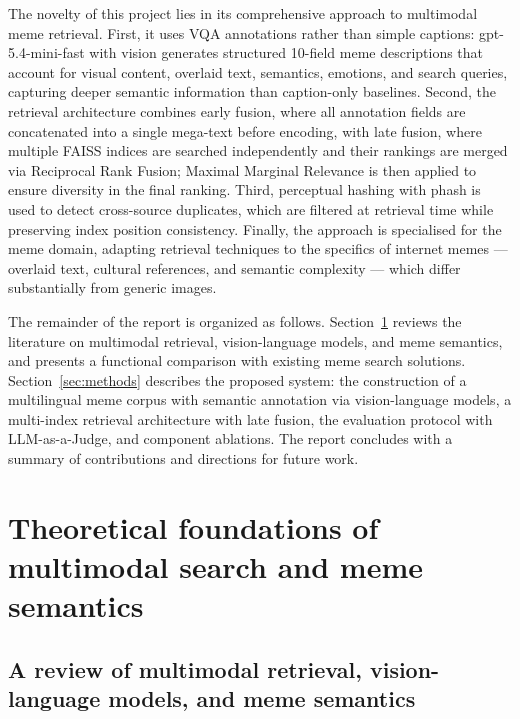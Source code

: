 \documentclass[a4paper,12pt]{article}
\begin{document}
The novelty of this project lies in its comprehensive approach to multimodal meme retrieval. First, it uses VQA annotations rather than simple captions: gpt-5.4-mini-fast with vision generates structured 10-field meme descriptions that account for visual content, overlaid text, semantics, emotions, and search queries, capturing deeper semantic information than caption-only baselines. Second, the retrieval architecture combines early fusion, where all annotation fields are concatenated into a single mega-text before encoding, with late fusion, where multiple FAISS indices are searched independently and their rankings are merged via Reciprocal Rank Fusion; Maximal Marginal Relevance is then applied to ensure diversity in the final ranking. Third, perceptual hashing with phash is used to detect cross-source duplicates, which are filtered at retrieval time while preserving index position consistency. Finally, the approach is specialised for the meme domain, adapting retrieval techniques to the specifics of internet memes --- overlaid text, cultural references, and semantic complexity --- which differ substantially from generic images.

The remainder of the report is organized as follows. Section~\ref{sec:relatedwork} reviews the literature on multimodal retrieval, vision-language models, and meme semantics, and presents a functional comparison with existing meme search solutions. Section~\ref{sec:methods} describes the proposed system: the construction of a multilingual meme corpus with semantic annotation via vision-language models, a multi-index retrieval architecture with late fusion, the evaluation protocol with LLM-as-a-Judge, and component ablations. The report concludes with a summary of contributions and directions for future work.

\pagebreak

\section{Theoretical foundations of multimodal search and meme semantics}
\label{sec:relatedwork}

\subsection{A review of multimodal retrieval, vision-language models, and meme semantics}
\end{document}
